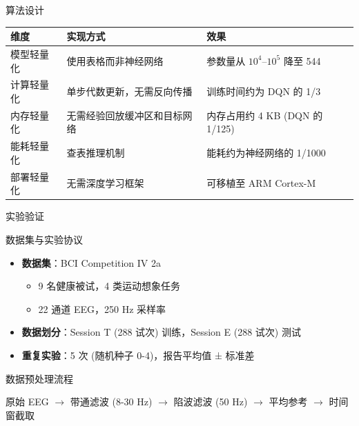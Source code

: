 \documentclass[aspectratio=169, 10pt]{beamer}
\begin{document}
\begin{frame}{算法设计}
\begin{table}
\centering
\small
\begin{tabular}{lll}
\toprule
\textbf{维度} & \textbf{实现方式} & \textbf{效果} \\
\midrule
模型轻量化 & 使用表格而非神经网络 & 参数量从 $10^4$–$10^5$ 降至 544 \\
计算轻量化 & 单步代数更新，无需反向传播 & 训练时间约为 DQN 的 1/3 \\
内存轻量化 & 无需经验回放缓冲区和目标网络 & 内存占用约 4 KB (DQN 的 1/125) \\
能耗轻量化 & 查表推理机制 & 能耗约为神经网络的 1/1000 \\
部署轻量化 & 无需深度学习框架 & 可移植至 ARM Cortex-M \\
\bottomrule
\end{tabular}
\end{table}
\end{frame}

\begin{frame}{实验验证}
\begin{block}{数据集与实验协议}
\begin{itemize}
    \item \textbf{数据集}：BCI Competition IV 2a
    \begin{itemize}
        \item 9 名健康被试，4 类运动想象任务
        \item 22 通道 EEG，250 Hz 采样率
    \end{itemize}
    \item \textbf{数据划分}：Session T (288 试次) 训练，Session E (288 试次) 测试
    \item \textbf{重复实验}：5 次 (随机种子 0-4)，报告平均值 ± 标准差
\end{itemize}
\end{block}

\vspace{0.3cm}
\begin{block}{数据预处理流程}
\begin{center}
原始 EEG $\rightarrow$ 带通滤波 (8-30 Hz) $\rightarrow$ 陷波滤波 (50 Hz) $\rightarrow$ 平均参考 $\rightarrow$ 时间窗截取
\end{center}
\end{block}
\end{frame}
\end{document}
